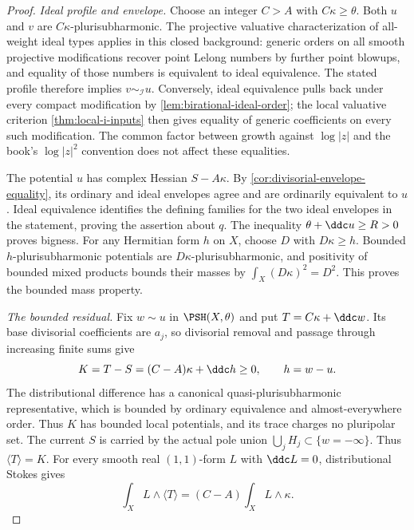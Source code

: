 \begin{proof}
\emph{Ideal profile and envelope.} Choose an integer $C>A$
with $C\kappa\geq\theta$. Both $u$ and $v$ are
$C\kappa$-plurisubharmonic. The projective valuative
characterization of all-weight ideal types applies in this
closed background: generic orders on all smooth projective
modifications recover point Lelong numbers by further point
blowups, and equality of those numbers is equivalent to ideal
equivalence. The stated profile therefore implies
$v\sim_{\mathcal I}u$. Conversely, ideal equivalence pulls
back under every compact modification by
\cref{lem:birational-ideal-order}; the local valuative criterion
\cref{thm:local-i-inputs} then gives equality of generic
coefficients on every such modification. The common factor
between growth against $\log|z|$ and the book's
$\log|z|^2$ convention does not affect these equalities.

The potential $u$ has complex Hessian $S-A\kappa$.
By \cref{cor:divisorial-envelope-equality}, its ordinary and
ideal envelopes agree and are ordinarily equivalent to $u$.
Ideal equivalence identifies the defining families for the
two ideal envelopes in the statement, proving the assertion
about $q$. The inequality $\theta+\ddc u\geq R>0$ proves
bigness. For any Hermitian form $h$ on $X$, choose $D$ with
$D\kappa\geq h$. Bounded $h$-plurisubharmonic potentials are
$D\kappa$-plurisubharmonic, and positivity of bounded mixed
products bounds their masses by $\int_X(D\kappa)^2=D^2$.
This proves the bounded mass property.

\emph{The bounded residual.} Fix $w\sim u$ in
$\PSH(X,\theta)$ and put $T=C\kappa+\ddc w$.
Its base divisorial coefficients are $a_j$, so divisorial
removal and passage through increasing finite sums give
\[
 K=T-S=(C-A)\kappa+\ddc h\geq0,\qquad h=w-u.
\]
The distributional difference has a canonical
quasi-plurisubharmonic representative, which is bounded by
ordinary equivalence and almost-everywhere order. Thus $K$
has bounded local potentials, and its trace charges no
pluripolar set. The current $S$ is carried by the actual pole
union $\bigcup_jH_j\subset\{w=-\infty\}$. Thus
$\langle T\rangle=K$. For every smooth real $(1,1)$-form $L$
with $\ddc L=0$, distributional Stokes gives
\[
 \int_X L\wedge\langle T\rangle
       =(C-A)\int_XL\wedge\kappa.
\]


\end{proof}
